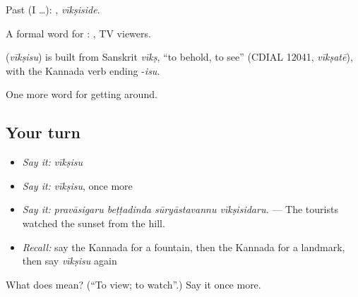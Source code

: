 Past (I …): , \emph{vīkṣiside}.

A formal word for :  , TV viewers.

\begin{cousinweb}
\textbf{} (\emph{vīkṣisu}) is built from Sanskrit \emph{vīkṣ}, \textquotedblleft{}to behold, to see\textquotedblright{} (CDIAL 12041, \emph{vīkṣatē}), with the Kannada verb ending -\emph{isu}.
\end{cousinweb}

\begin{grammarlens}[title={What you've built}]
One more word for getting around.
\end{grammarlens}

\subsection*{Your turn}
\begin{itemize}
\raggedright
  \item \emph{Say it:} \emph{vīkṣisu}
  \item \emph{Say it:} \emph{vīkṣisu}, once more
  \item \emph{Say it:} \emph{pravāsigaru beṭṭadinda sūryāstavannu vīkṣisidaru.} — The tourists watched the sunset from the hill.
  \item \emph{Recall:} say the Kannada for a fountain, then the Kannada for a landmark, then say \emph{vīkṣisu} again
\end{itemize}

\begin{tcolorbox}[breakable,colback=teal!4,colframe=teal!35!black,title={Before you move on}]
What does  mean? (\textquotedblleft{}To view; to watch\textquotedblright{}.) Say it once more.
\end{tcolorbox}
